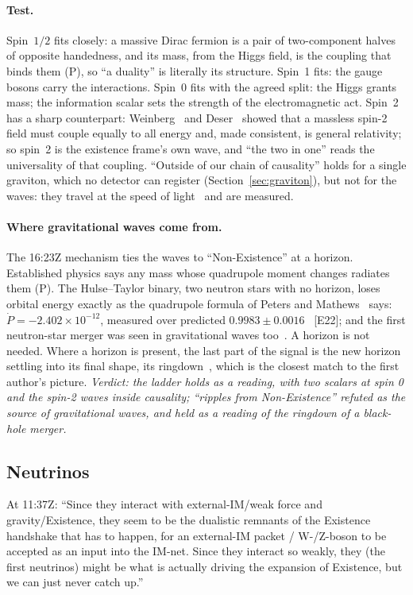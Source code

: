 \documentclass[11pt,a4paper]{article}
\theoremstyle{definition}
\theoremstyle{remark}
\newcommand{\chk}[1]{\textsf{[#1]}}
\newcommand{\tagP}{\textsf{(P)}}
\begin{document}
\paragraph{Test.} Spin~$1/2$ fits closely: a massive Dirac fermion is a pair of two-component halves of opposite handedness, and its mass,
from the Higgs field, is the coupling that binds them \tagP, so ``a duality'' is literally its structure. Spin~1 fits: the gauge bosons carry
the interactions. Spin~0 fits with the agreed split: the Higgs grants mass; the information scalar sets the strength of the electromagnetic
act. Spin~2 has a sharp counterpart: Weinberg~\cite{weinberg64} and Deser~\cite{deser70} showed that a massless spin-2 field must couple
equally to all energy and, made consistent, is general relativity; so spin~2 is the existence frame's own wave, and ``the two in one'' reads
the universality of that coupling. ``Outside of our chain of causality'' holds for a single graviton, which no detector can register
(Section~\ref{sec:graviton}), but not for the waves: they travel at the speed of light~\cite{gw170817} and are measured.

\paragraph{Where gravitational waves come from.} The 16:23Z mechanism ties the waves to ``Non-Existence'' at a horizon. Established physics
says any mass whose quadrupole moment changes radiates them \tagP. The Hulse--Taylor binary, two neutron stars with no horizon, loses orbital
energy exactly as the quadrupole formula of Peters and Mathews~\cite{pm63} says: $\dot P=-2.402\times10^{-12}$, measured over predicted
$0.9983\pm0.0016$~\cite{wh16} \chk{E22}; and the first neutron-star merger was seen in gravitational waves too~\cite{gw170817}. A horizon is
not needed. Where a horizon is present, the last part of the signal is the new horizon settling into its final shape, its
ringdown~\cite{gw150914}, which is the closest match to the first author's picture. \emph{Verdict: the ladder holds as a reading, with
two scalars at spin 0 and the spin-2 waves inside causality; ``ripples from Non-Existence'' refuted as the source of gravitational waves, and
held as a reading of the ringdown of a black-hole merger.}

\subsection{Neutrinos}

At 11:37Z: ``Since they interact with external-IM/weak force and gravity/Existence, they seem to be the dualistic remnants of the
Existence handshake that has to happen, for an external-IM packet / W-/Z-boson to be accepted as an input into the IM-net. Since they
interact so weakly, they (the first neutrinos) might be what is actually driving the expansion of Existence, but we can just never catch
up.''
\end{document}
